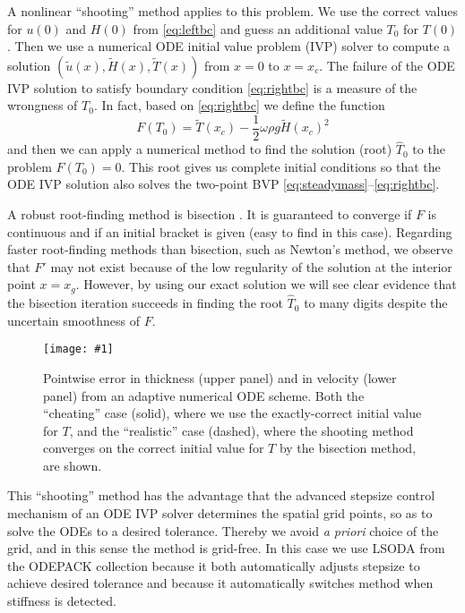 \documentclass[review,letterpaper]{igs}
\newcommand{\onecol}[1]{\texttt{[image: \#1]}}
\begin{document}
A nonlinear ``shooting'' method \citep[section 17.1]{Pressetal} applies to this problem.  We use the correct values for $u(0)$ and $H(0)$ from \eqref{eq:leftbc} and guess an additional value $T_0$ for $T(0)$.  Then we use a numerical ODE initial value problem (IVP) solver to compute a solution $(\tilde u(x),\tilde H(x),\tilde T(x))$ from $x=0$ to $x=x_c$.  The failure of the ODE IVP solution to satisfy boundary condition \eqref{eq:rightbc} is a measure of the wrongness of $T_0$.  In fact, based on \eqref{eq:rightbc} we define the function
\begin{equation}
F(T_0) = \tilde T(x_c) - \frac{1}{2} \omega \rho g \tilde H(x_c)^2  \label{eq:Fbisection}
\end{equation}
and then we can apply a numerical method to find the solution (root) $\hat T_0$ to the problem $F(T_0)=0$.  This root gives us complete initial conditions so that the ODE IVP solution also solves the two-point BVP \eqref{eq:steadymass}--\eqref{eq:rightbc}.

A robust root-finding method is bisection \citep[section 9.1]{Pressetal}.  It is guaranteed to converge if $F$ is continuous and if an initial bracket is given (easy to find in this case).  Regarding faster root-finding methods than bisection, such as Newton's method, we observe that $F'$ may not exist because of the low regularity of the solution at the interior point $x=x_g$. However, by using our exact solution we will see clear evidence that the bisection iteration succeeds in finding the root $\hat T_0$ to many digits despite the uncertain smoothness of $F$.

\begin{figure}[ht]
\onecol{em-error}
\caption{Pointwise error in thickness (upper panel) and in velocity (lower panel) from an adaptive numerical ODE scheme.  Both the ``cheating'' case (solid), where we use the exactly-correct initial value for $T$, and the ``realistic'' case (dashed), where the shooting method converges on the correct initial value for $T$ by the bisection method, are shown.} \label{fig:shoot-error}
\end{figure}

This ``shooting'' method has the advantage that the advanced stepsize control mechanism of an ODE IVP solver determines the spatial grid points, so as to solve the ODEs to a desired tolerance.  Thereby we avoid \emph{a priori} choice of the grid, and in this sense the method is grid-free.  In this case we use LSODA from the ODEPACK collection \citep{Hindmarsh1983ODEPACK} because it both automatically adjusts stepsize to achieve desired tolerance and because it automatically switches method when stiffness \citep[section 16.6]{Pressetal} is detected.
\end{document}
